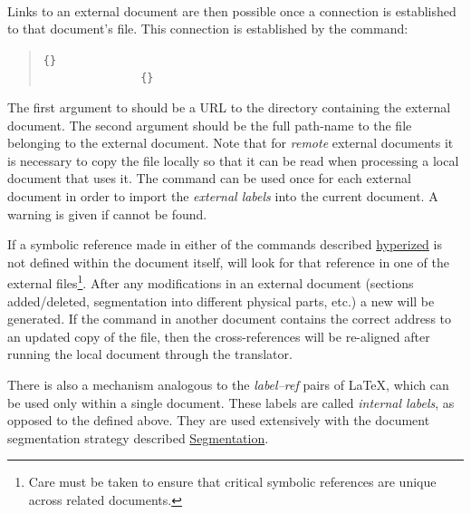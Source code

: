\paragraph*{\label{externlabels}}
Links to an external document are then possible once a connection 
is established to that document's  file.  
This connection is established by the  command:%
%
\begin{quote}
\begin{small}
\verb|{|\verb|}|\\
\verb|               {|\verb|}|
\end{small}
\end{quote}
%
\html{\\}%
The first argument to  should be a URL to 
the directory containing the external document.  
The second argument
should be the full path-name to the  file belonging
to the external document.  Note that for \emph{remote} external documents
it is necessary to copy the  file locally so that it
can be read when processing a local document that uses it.
The command  can be used once for each external
document in order to import the \textit{external labels}\label{externallabels}
into the current document.
A warning is given if  cannot be found.

If a symbolic reference made in either of the commands described
\hyperref{on the previous page}{in Section~}{}{hyperized} is not 
defined within the document itself,
\latextohtml{} will look for that reference in one of the external
files\footnote{Care must be taken to ensure that critical symbolic
references are unique across related documents.}.
After any modifications in an external document 
(sections added/deleted, segmentation into different physical parts, etc.) 
a new  will be generated.  
If the  command in another 
document contains the correct address to an updated copy of
the  file, then the cross-references will be re-aligned
after running the local document through the translator.

\label{internallabels}\html{\\}%
There is also a mechanism analogous to the
\textit{label--ref} pairs of \LaTeX, which can be used only 
within a single document. 
These labels are called \textit{internal labels},
as opposed to the  defined above.
They are used extensively with the document segmentation strategy
described \hyperref{later}{in Section~}{}{Segmentation}.

